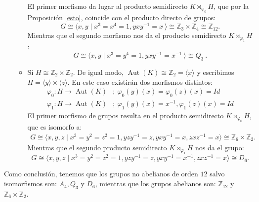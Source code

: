\begin{Ejemplo}
\begin{itemize}
\begin{itemize}
            El primer morfismo da lugar al producto semidirecto $K\rtimes_{\varphi_{0}} H$, que por la Proposición \ref{esto}, coincide con el producto directo de grupos:
            \[
                G \cong \langle x,y \mid x^3=x^4 =1, yxy^{-1} = x\: \rangle \cong \mathbb{Z}_3 \times \mathbb{Z}_4 \cong  \mathbb{Z}_{12} .
            \]
            Mientras que el segundo morfismo nos da el producto semidirecto $K\rtimes_{\varphi_{1}} H$:
            \[
                G \cong \langle x,y \mid x^3=y^4 =1, yxy^{-1} = x^{-1}\: \rangle \cong Q_3 \:.
            \]
            \item Si $H \cong \mathbb{Z}_2 \times \mathbb{Z}_2$. De igual modo, $\operatorname{Aut}(K) \cong \mathbb{Z}_2= \langle x \rangle$ y escribimos $H=\langle y \rangle \times \langle z \rangle$. En este caso existirán dos morfismos distintos:
            \begin{align*}
            \varphi_{0} \colon H \rightarrow \operatorname{Aut}(K) &; \: \varphi_{0}(y)(x) = \varphi_{0}(z)(x) = Id \\
            \varphi_{1} \colon H \rightarrow \operatorname{Aut}(K) &; \: \varphi_{1}(y)(x) = x^{-1}, \varphi_{1}(z)(x) = Id
            \end{align*}
            El primer morfismo de grupos resulta en el producto semidirecto  $K \rtimes_{\varphi_{0}} H$, que es isomorfo a:
            \begin{align*}
                G \cong \langle x,y,z \mid x^3=y^2=z^2=1,  yzy^{-1}=z, yxy^{-1}=x, zxz^{-1}=x \rangle \cong \mathbb{Z}_6 \times \mathbb{Z}_2 .
            \end{align*}
            Mientras que el segundo producto semidirecto  $K \rtimes_{\varphi_{1}} H$ nos da el grupo:
            \[
            G \cong \langle x,y,z \mid x^3=y^2=z^2=1, yzy^{-1}=z, yxy^{-1}=x^{-1},zxz^{-1}=x  \rangle \cong D_6  .
            \]
            
        \end{itemize}
\end{itemize}

Como conclusión, tenemos que los grupos no abelianos de orden $12$ salvo isomorfismos son: $A_4, Q_3$ y $D_6$, mientras que los grupos abelianos son: $\mathbb{Z}_{12}$ y $\mathbb{Z}_6 \times \mathbb{Z}_2$.

\end{Ejemplo}



